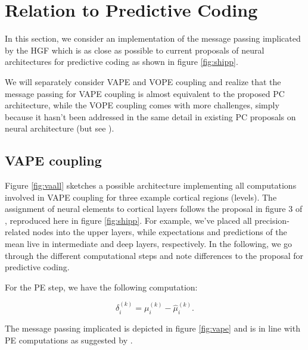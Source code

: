 \section{Relation to Predictive Coding}

In this section, we consider an implementation of the message passing implicated by the HGF which is as close as possible to current proposals of neural architectures for predictive coding \cite{Shipp2016} as shown in figure \ref{fig:shipp}.\\


We will separately consider \textsf{VAPE} and \textsf{VOPE} coupling and realize that the message passing for \textsf{VAPE} coupling is almost equivalent to the proposed PC architecture, while the \textsf{VOPE} coupling comes with more challenges, simply because it hasn't been addressed in the same detail in existing PC proposals on neural architecture (but see \cite{Kanai2015}).


\subsection{VAPE coupling}

Figure \ref{fig:vaall} sketches a possible architecture implementing all computations involved in \textsf{VAPE} coupling for three example cortical regions (levels). The assignment of neural elements to cortical layers follows the proposal in figure 3 of \cite{Shipp2016}, reproduced here in figure \ref{fig:shipp}. For example, we've placed all precision-related nodes into the upper layers, while expectations and predictions of the mean live in intermediate and deep layers, respectively. In the following, we go through the different computational steps and note differences to the proposal for predictive coding.

For the \textsf{PE} step, we have the following computation:

\begin{equation}
	\delta_i^{(k)} = \mu_i^{(k)} - \hat{\mu}_i^{(k)}.
\end{equation}


The message passing implicated is depicted in figure \ref{fig:vape} and is in line with PE computations as suggested by \cite{Shipp2016}.

